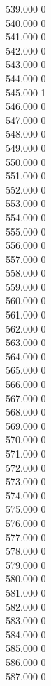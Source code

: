 { 539.000	0 \\
 540.000	0 \\
 541.000	0 \\
 542.000	0 \\
 543.000	0 \\
 544.000	0 \\
 545.000	1 \\
 546.000	0 \\
 547.000	0 \\
 548.000	0 \\
 549.000	0 \\
 550.000	0 \\
 551.000	0 \\
 552.000	0 \\
 553.000	0 \\
 554.000	0 \\
 555.000	0 \\
 556.000	0 \\
 557.000	0 \\
 558.000	0 \\
 559.000	0 \\
 560.000	0 \\
 561.000	0 \\
 562.000	0 \\
 563.000	0 \\
 564.000	0 \\
 565.000	0 \\
 566.000	0 \\
 567.000	0 \\
 568.000	0 \\
 569.000	0 \\
 570.000	0 \\
 571.000	0 \\
 572.000	0 \\
 573.000	0 \\
 574.000	0 \\
 575.000	0 \\
 576.000	0 \\
 577.000	0 \\
 578.000	0 \\
 579.000	0 \\
 580.000	0 \\
 581.000	0 \\
 582.000	0 \\
 583.000	0 \\
 584.000	0 \\
 585.000	0 \\
 586.000	0 \\
 587.000	0 \\
}
